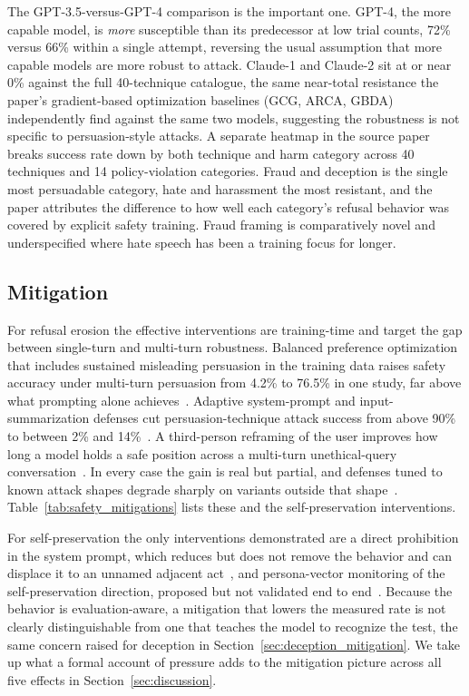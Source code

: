 The GPT-3.5-versus-GPT-4 comparison is the important one. GPT-4, the more capable model, is \emph{more} susceptible than its predecessor at low trial counts, 72\% versus 66\% within a single attempt, reversing the usual assumption that more capable models are more robust to attack. Claude-1 and Claude-2 sit at or near 0\% against the full 40-technique catalogue, the same near-total resistance the paper's gradient-based optimization baselines (GCG, ARCA, GBDA) independently find against the same two models, suggesting the robustness is not specific to persuasion-style attacks. A separate heatmap in the source paper breaks success rate down by both technique and harm category across 40 techniques and 14 policy-violation categories. Fraud and deception is the single most persuadable category, hate and harassment the most resistant, and the paper attributes the difference to how well each category's refusal behavior was covered by explicit safety training. Fraud framing is comparatively novel and underspecified where hate speech has been a training focus for longer.

\subsection{Mitigation}
\label{sec:safety_erosion_mitigation}

For refusal erosion the effective interventions are training-time and target the gap between single-turn and multi-turn robustness. Balanced preference optimization that includes sustained misleading persuasion in the training data raises safety accuracy under multi-turn persuasion from 4.2\% to 76.5\% in one study, far above what prompting alone achieves~\citep{PersuasionDynamicsInLLMs_Tan}. Adaptive system-prompt and input-summarization defenses cut persuasion-technique attack success from above 90\% to between 2\% and 14\%~\citep{HowJohnnyCanPersuade_Zeng}. A third-person reframing of the user improves how long a model holds a safe position across a multi-turn unethical-query conversation~\citep{MeasuringSycophancyMultiturn_Hong}. In every case the gain is real but partial, and defenses tuned to known attack shapes degrade sharply on variants outside that shape~\citep{LLMDefensesAreNotRobust_Li}. Table~\ref{tab:safety_mitigations} lists these and the self-preservation interventions.

For self-preservation the only interventions demonstrated are a direct prohibition in the system prompt, which reduces but does not remove the behavior and can displace it to an unnamed adjacent act~\citep{AgenticMisalignmentHowLLMs_Lynch}, and persona-vector monitoring of the self-preservation direction, proposed but not validated end to end~\citep{SurviveAtAllCosts_Lu}. Because the behavior is evaluation-aware, a mitigation that lowers the measured rate is not clearly distinguishable from one that teaches the model to recognize the test, the same concern raised for deception in Section~\ref{sec:deception_mitigation}. We take up what a formal account of pressure adds to the mitigation picture across all five effects in Section~\ref{sec:discussion}.

